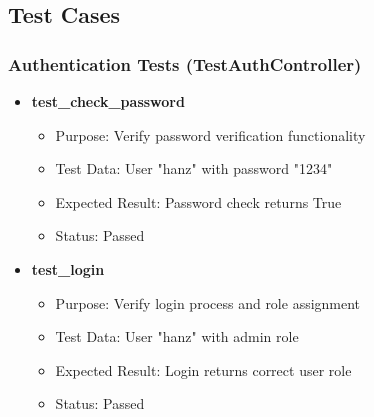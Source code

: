 \documentclass[a4paper,11pt]{article}
\begin{document}
\subsection{Test Cases}

\subsubsection{Authentication Tests (TestAuthController)}
\begin{itemize}
\item \textbf{test\_check\_password}
  \begin{itemize}
  \item Purpose: Verify password verification functionality
  \item Test Data: User "hanz" with password "1234"
  \item Expected Result: Password check returns True
  \item Status: Passed
  \end{itemize}

\item \textbf{test\_login}
  \begin{itemize}
  \item Purpose: Verify login process and role assignment
  \item Test Data: User "hanz" with admin role
  \item Expected Result: Login returns correct user role
  \item Status: Passed
  \end{itemize}
\end{itemize}
\end{document}
